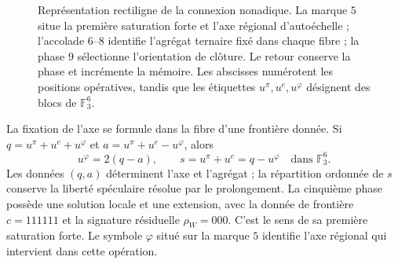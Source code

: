 \begin{figure}[H]
\centering
{}
\caption{Représentation rectiligne de la connexion nonadique. La marque
\(5\) situe la première saturation forte et l'axe régional d'autoéchelle ;
l'accolade \(6\)--\(8\) identifie l'agrégat ternaire
fixé dans chaque fibre ; la phase \(9\) sélectionne l'orientation de
clôture. Le retour conserve la phase et incrémente la mémoire. Les
abscisses numérotent les positions opératives, tandis que les étiquettes
\(u^\pi,u^e,u^\varphi\) désignent des blocs de \(\mathbb F_3^6\).}
\label{x_reciprocidad:mono-recta:figura}
\end{figure}



La fixation de l'axe se formule dans la fibre d'une frontière donnée. Si
\(q=u^\pi+u^e+u^\varphi\) et
\(a=u^\pi+u^e-u^\varphi\), alors
\[
 u^\varphi=2(q-a),\qquad s=u^\pi+u^e=q-u^\varphi
 \quad\text{dans }\mathbb F_3^6.
\]
Les données \((q,a)\) déterminent l'axe et l'agrégat ; la répartition ordonnée de \(s\) conserve la liberté spéculaire résolue par le prolongement. La cinquième phase possède une solution locale et une extension, avec la donnée de frontière \(c=111111\) et la signature résiduelle \(\rho_W=000\). C'est le sens de sa première saturation forte. Le symbole \(\varphi\) situé sur la marque \(5\) identifie l'axe régional qui intervient dans cette opération.

